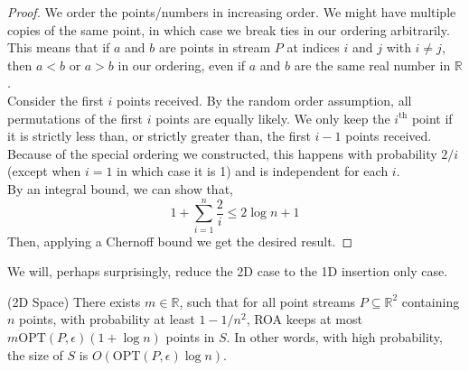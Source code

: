 \begin{proof}
We order the points/numbers in increasing order. We might have multiple copies of the same point, in which case we break ties in our ordering arbitrarily. This means that if $a$ and $b$ are points in stream $P$ at indices $i$ and $j$ with $i \neq j$, then $a < b$ or $a > b$ in our ordering, even if $a$ and $b$ are the same real number in $\mathbb{R}$.
\\

Consider the first $i$ points received. By the random order assumption, all permutations of the first $i$ points are equally likely. We only keep the $i^{\mbox{th}}$ point if it is strictly less than, or strictly greater than, the first $i-1$ points received. Because of the special ordering we constructed, this happens with probability $2/i$ (except when $i = 1$ in which case it is 1) and is independent for each $i$. 
\\

By an integral bound, we can show that,
\[ 1 + \sum_{i=1}^n \frac{2}{i} \leq 2\log{n} + 1 \]
Then, applying a Chernoff bound we get the desired result.
\end{proof}

We will, perhaps surprisingly, reduce the 2D case to the 1D insertion only case.

\begin{theorem}
\label{thm:2droaspace}
(2D Space) There exists $m \in \mathbb{R}$, such that for all point streams $P \subseteq \mathbb{R}^2$ containing $n$ points, with probability at least $1 - 1/n^2$, ROA keeps at most $m\mbox{OPT}(P, \epsilon)(1 + \log{n})$ points in $S$. In other words, with high probability, the size of $S$ is $O(\mbox{OPT}(P, \epsilon)\log{n})$.
\end{theorem}

